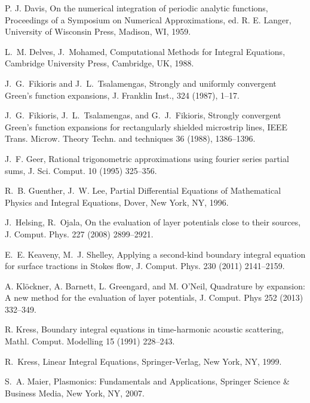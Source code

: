\documentclass{article}[12pt]
\numberwithin{equation}{section}
\begin{document}
\begin{thebibliography}{10}
 P. J. Davis, On the numerical integration of
  periodic analytic functions, Proceedings of a Symposium on Numerical
  Approximations, ed. R. E. Langer, University of Wisconsin Press,
  Madison, WI, 1959.

 L.~M. Delves, J.~Mohamed,
  Computational {M}ethods for {I}ntegral {E}quations, Cambridge
  University Press, Cambridge, UK, 1988.

 J.~G.~Fikioris and
    J.~L.~Tsalamengas, Strongly and uniformly convergent Green's
    function expansions, J.  Franklin Inst., 324 (1987), 1--17.

 J.~G.~Fikioris,
    J.~L.~Tsalamengas, and G.~J.~Fikioris, Strongly convergent Green's
    function expansions for rectangularly shielded microstrip lines,
    IEEE Trans. Microw. Theory Techn.  and techniques 36 (1988),
    1386--1396.
  
 J.~F. Geer, Rational trigonometric
  approximations using fourier series partial sums, J. Sci. Comput. 10
  (1995) 325--356.

 R.~B. Guenther, J.~W. Lee, Partial
  Differential Equations of Mathematical Physics and Integral
  Equations, Dover, New York, NY, 1996.

 J.~Helsing, R.~Ojala, On the
  evaluation of layer potentials close to their sources,
  J. Comput. Phys. 227 (2008) 2899--2921.

 E.~E. Keaveny, M.~J. Shelley, Applying a
  second-kind boundary integral equation for surface tractions in
  {S}tokes flow, J. Comput. Phys. 230 (2011) 2141--2159.
  
 A. Kl\"{o}ckner,
    A. Barnett, L. Greengard, and M. O'Neil, Quadrature by expansion:
    A new method for the evaluation of layer potentials,
    J. Comput. Phys 252 (2013) 332--349.  

 R. Kress, Boundary integral equations in
  time-harmonic acoustic scattering, Mathl. Comput. Modelling 15
  (1991) 228--243.

 R.~Kress, Linear Integral Equations,
  Springer-Verlag, New York, NY, 1999.

 S.~A. Maier, Plasmonics: Fundamentals and
  Applications, Springer Science \& Business Media, New York, NY,
  2007.


\end{thebibliography}
\end{document}
